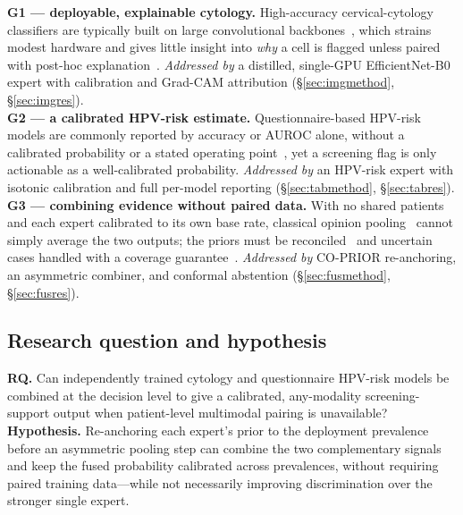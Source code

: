 \documentclass[sigplan,nonacm,screen]{acmart}
\begin{document}
\begin{gapbox}
\textbf{G1 --- deployable, explainable cytology.} High-accuracy cervical-cytology classifiers are typically
built on large convolutional backbones~\cite{plissiti2018,tan2019efficientnet}, which strains modest hardware
and gives little insight into \emph{why} a cell is flagged unless paired with post-hoc
explanation~\cite{selvaraju2017}. \emph{Addressed by} a distilled, single-GPU EfficientNet-B0 expert with
calibration and Grad-CAM attribution (\S\ref{sec:imgmethod}, \S\ref{sec:imgres}).\\[3pt]
\textbf{G2 --- a calibrated HPV-risk estimate.} Questionnaire-based HPV-risk models are commonly reported by
accuracy or AUROC alone, without a calibrated probability or a stated operating point~\cite{hu2024nhanes}, yet
a screening flag is only actionable as a well-calibrated probability. \emph{Addressed by} an HPV-risk expert with
isotonic calibration and full per-model reporting (\S\ref{sec:tabmethod}, \S\ref{sec:tabres}).\\[3pt]
\textbf{G3 --- combining evidence without paired data.} With no shared patients and each expert calibrated to
its own base rate, classical opinion pooling~\cite{kittler1998} cannot simply average the two outputs; the
priors must be reconciled~\cite{saerens2002} and uncertain cases handled with a coverage
guarantee~\cite{angelopoulos2023}. \emph{Addressed by} CO-PRIOR re-anchoring, an asymmetric combiner, and
conformal abstention (\S\ref{sec:fusmethod}, \S\ref{sec:fusres}).
\end{gapbox}

\subsection{Research question and hypothesis}
\textbf{RQ.} Can independently trained cytology and questionnaire HPV-risk models be combined at the decision
level to give a calibrated, any-modality screening-support output when patient-level multimodal pairing is
unavailable? \textbf{Hypothesis.} Re-anchoring each expert's prior to the deployment prevalence before an
asymmetric pooling step can combine the two complementary signals and keep the fused probability calibrated
across prevalences, without requiring paired training data---while not necessarily improving discrimination
over the stronger single expert.
\end{document}
